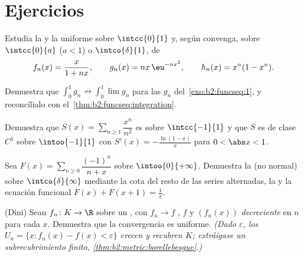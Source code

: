 \section{Ejercicios}

\begin{exercise}[$\star$]\label{exo:b2:funcseq:1}
Estudia la  y la uniforme sobre $\intcc{0}{1}$
y, según convenga, sobre $\intcc{0}{a}$ ($a < 1$) o
$\intco{\delta}{1}$, de
\[
f_n(x) = \frac{x}{1 + nx},
\qquad
g_n(x) = n x\,\eu^{-n x^2},
\qquad
h_n(x) = x^n(1 - x^n).
\]
\end{exercise}

\begin{exercise}[$\star$]\label{exo:b2:funcseq:2}
Demuestra que $\displaystyle\int_0^1 g_n \not\to \int_0^1 \lim g_n$
para las $g_n$ del~\cref{exo:b2:funcseq:1}, y reconcílialo con el~\cref{thm:b2:funcseq:integration}.
\end{exercise}

\begin{exercise}[$\star$]\label{exo:b2:funcseq:3}
Demuestra que $S(x) = \sum_{n\geq1} \dfrac{x^n}{n^2}$ es 
sobre $\intcc{-1}{1}$ y que $S$ es de clase $C^1$ sobre
$\intoo{-1}{1}$ con $S'(x) = -\frac{\ln(1-x)}{x}$ para $0 < \abs x <
1$.
\end{exercise}

\begin{exercise}[$\star\star$]\label{exo:b2:funcseq:4}
Sea $F(x) = \sum_{n \geq 0} \dfrac{(-1)^n}{n + x}$ sobre
$\intoo{0}{+\infty}$. Demuestra la  (no normal)
sobre $\intco{\delta}{\infty}$ mediante la cota del resto de las
series alternadas, la  y la ecuación funcional $F(x) +
F(x + 1) = \frac1x$.
\end{exercise}

\begin{exercise}[$\star\star$]\label{exo:b2:funcseq:5}
(Dini) Sean $f_n \colon K \to \R$  sobre un
 \emph{}, con $f_n \to f$
\emph{}, $f$  y $(f_n(x))$ \emph{decreciente} en
$n$ para cada $x$. Demuestra que la convergencia es uniforme.
\emph{(Dado $\varepsilon$, los  $U_n = \{x : f_n(x) - f(x) <
\varepsilon\}$ crecen y recubren $K$; extráigase un subrecubrimiento
finito, \cref{thm:b2:metric:borellebesgue}.)}
\end{exercise}

